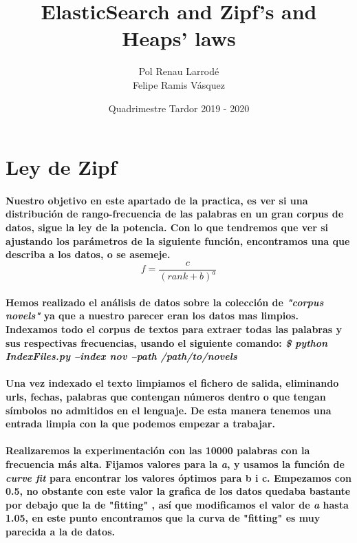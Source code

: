 \documentclass{article}
\title{ElasticSearch and Zipf’s and Heaps’ laws}
\date{Quadrimestre Tardor 2019 - 2020}
\author {
  Pol Renau Larrod\'e \\
  Felipe Ramis V\'asquez
}
\begin{document}
  \maketitle
  \newpage

  \section{Ley de Zipf}
        \paragraph{
            Nuestro objetivo en este apartado de la practica, es ver si una distribuci\'on de rango-frecuencia de las palabras en un gran corpus de datos, sigue la ley de la potencia.
            Con lo que tendremos que ver si  ajustando los par\'ametros de la siguiente funci\'on, encontramos una que describa a los datos, o se asemeje.
            \[ f = \frac{c}{(rank+b)^a} \]
        }
        \paragraph{
            Hemos realizado el análisis de datos sobre la colecci\'on de \textit{"corpus novels"} ya que a nuestro parecer eran los datos mas limpios.
            Indexamos todo el corpus de textos para extraer todas las palabras y sus respectivas frecuencias, usando el siguiente comando:
            \newline
            \newline
            \textit{ \$ python IndexFiles.py --index nov --path /path/to/novels}
        }
        \paragraph{
            Una vez indexado el texto limpiamos el fichero de salida, eliminando urls, fechas, palabras que contengan n\'umeros dentro o que tengan s\'imbolos no admitidos en el lenguaje.
            De esta manera tenemos una entrada limpia con la que podemos empezar a trabajar.
        }
        \paragraph{
              Realizaremos la experimentaci\'on con las 10000 palabras con la frecuencia más alta. Fijamos valores para la \textit{a}, y usamos la funci\'on de \textit{curve fit} para encontrar los valores \'optimos para b i c.
            Empezamos con 0.5, no obstante con este valor la grafica de los datos quedaba bastante por debajo que la de "fitting" ,
               as\'i que modificamos el valor de \textit{a} hasta 1.05, en este punto encontramos que la curva de "fitting" es muy parecida a la de datos.
        }
      \newpage
\end{document}
